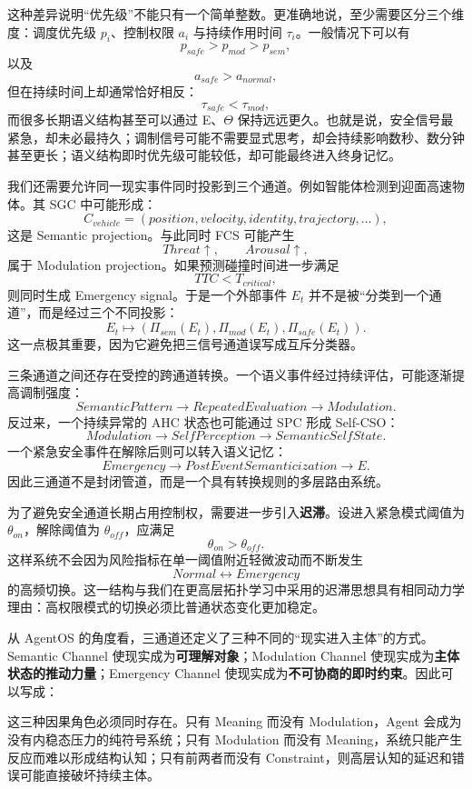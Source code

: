 这种差异说明“优先级”不能只有一个简单整数。更准确地说，至少需要区分三个维度：调度优先级 $p_i$、控制权限 $a_i$ 与持续作用时间 $\tau_i$。一般情况下可以有
\[
p_{safe}>p_{mod}>p_{sem},
\]
以及
\[
a_{safe}>a_{normal},
\]
但在持续时间上却通常恰好相反：
\[
\tau_{safe}
<
\tau_{mod},
\]
而很多长期语义结构甚至可以通过 E、$\Theta$ 保持远远更久。也就是说，安全信号最紧急，却未必最持久；调制信号可能不需要显式思考，却会持续影响数秒、数分钟甚至更长；语义结构即时优先级可能较低，却可能最终进入终身记忆。

我们还需要允许同一现实事件同时投影到三个通道。例如智能体检测到迎面高速物体。其 SGC 中可能形成：
\[
C_{vehicle}
=
(
position,
velocity,
identity,
trajectory,
\ldots
),
\]
这是 Semantic projection。与此同时 FCS 可能产生
\[
Threat\uparrow,\qquad
Arousal\uparrow,
\]
属于 Modulation projection。如果预测碰撞时间进一步满足
\[
TTC<T_{critical},
\]
则同时生成 Emergency signal。于是一个外部事件 $E_t$ 并不是被“分类到一个通道”，而是经过三个不同投影：
\[
E_t
\mapsto
\left(
\Pi_{sem}(E_t),
\Pi_{mod}(E_t),
\Pi_{safe}(E_t)
\right).
\]
这一点极其重要，因为它避免把三信号通道误写成互斥分类器。

三条通道之间还存在受控的跨通道转换。一个语义事件经过持续评估，可能逐渐提高调制强度：
\[
SemanticPattern
\rightarrow
RepeatedEvaluation
\rightarrow
Modulation.
\]
反过来，一个持续异常的 AHC 状态也可能通过 SPC 形成 Self-CSO：
\[
Modulation
\rightarrow
SelfPerception
\rightarrow
SemanticSelfState.
\]
一个紧急安全事件在解除后则可以转入语义记忆：
\[
Emergency
\rightarrow
PostEventSemanticization
\rightarrow
E.
\]
因此三通道不是封闭管道，而是一个具有转换规则的多层路由系统。

为了避免安全通道长期占用控制权，需要进一步引入\textbf{迟滞}。设进入紧急模式阈值为 $\theta_{on}$，解除阈值为 $\theta_{off}$，应满足
\[
\theta_{on}>\theta_{off}.
\]
这样系统不会因为风险指标在单一阈值附近轻微波动而不断发生
\[
Normal
\leftrightarrow
Emergency
\]
的高频切换。这一结构与我们在更高层拓扑学习中采用的迟滞思想具有相同动力学理由：高权限模式的切换必须比普通状态变化更加稳定。

从 AgentOS 的角度看，三通道还定义了三种不同的“现实进入主体”的方式。Semantic Channel 使现实成为\textbf{可理解对象}；Modulation Channel 使现实成为\textbf{主体状态的推动力量}；Emergency Channel 使现实成为\textbf{不可协商的即时约束}。因此可以写成：
\begin{statementbox}
\centering
{}
\end{statementbox}
这三种因果角色必须同时存在。只有 Meaning 而没有 Modulation，Agent 会成为没有内稳态压力的纯符号系统；只有 Modulation 而没有 Meaning，系统只能产生反应而难以形成结构认知；只有前两者而没有 Constraint，则高层认知的延迟和错误可能直接破坏持续主体。

